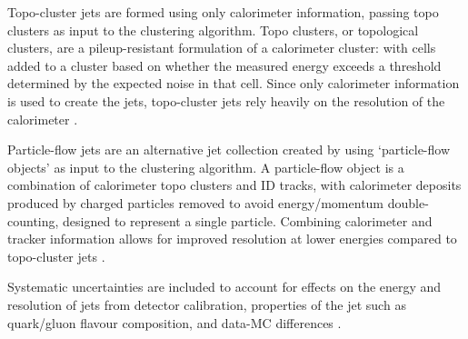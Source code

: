 Topo-cluster jets are formed using only calorimeter information, passing topo
clusters as input to the clustering algorithm. Topo clusters, or topological
clusters, are a pileup-resistant formulation of a calorimeter cluster: with
cells added to a cluster based on whether the measured energy exceeds a
threshold determined by the expected noise in that cell. Since only calorimeter
information is used to create the jets, topo-cluster jets rely heavily on the
resolution of the calorimeter \cite{Aad2017b}.

Particle-flow jets are an alternative jet collection created by using
`particle-flow objects' as input to the clustering algorithm. A particle-flow
object is a combination of calorimeter topo clusters and \ac{ID} tracks, with
calorimeter deposits produced by charged particles removed to avoid
energy/momentum double-counting, designed to represent a single particle.
Combining calorimeter and tracker information allows for improved resolution at
lower energies compared to topo-cluster jets \cite{Aaboud2017a}.

Systematic uncertainties are included to account for effects on the energy and
resolution of jets from detector calibration, properties of the jet such as
quark/gluon flavour composition, and data-\ac{MC} differences
\cite{JESUncerts2017}.
